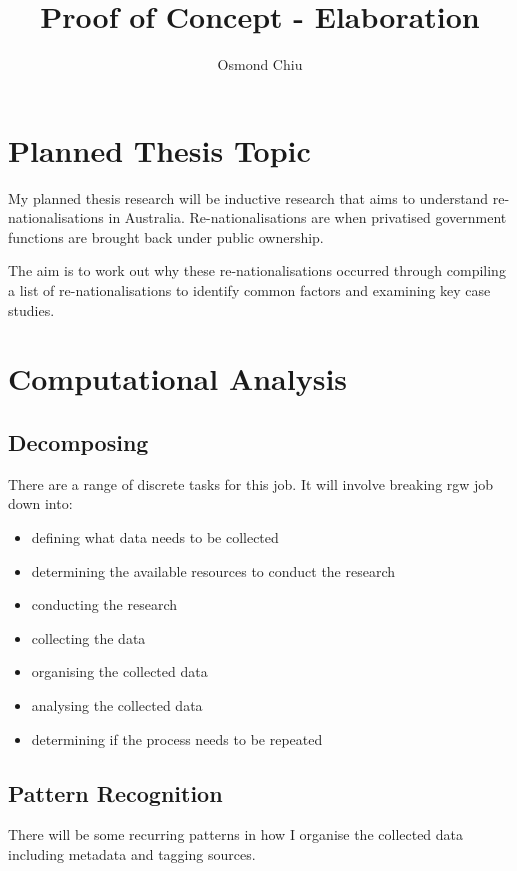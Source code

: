 \documentclass{article}
\title{Proof of Concept - Elaboration}
\author{Osmond Chiu}
\begin{document}
\maketitle
\section*{Planned Thesis Topic}

My planned thesis research will be inductive research that aims to understand re-nationalisations in Australia. Re-nationalisations are when privatised government functions are brought back under public ownership.\par
The aim is to work out why these re-nationalisations occurred through compiling a list of re-nationalisations to identify common factors and examining key case studies.

\section*{Computational Analysis}
\subsection*{Decomposing}
There are a range of discrete tasks for this job. It will involve breaking rgw job down into:
\begin{itemize}
    \item defining what data needs to be collected
    \item determining the available resources to conduct the research
    \item conducting the research
    \item collecting the data
    \item organising the collected data
    \item analysing the collected data
    \item determining if the process needs to be repeated
\end{itemize}

\subsection*{Pattern Recognition}
There will be some recurring patterns in how I organise the collected data including metadata and tagging sources.\par
\end{document}
